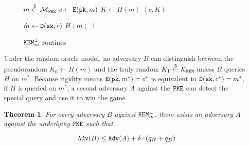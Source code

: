 \documentclass{article}
\newtheorem{theorem}{Theorem}[section]
\begin{document}
\begin{figure}[H]
    \center
    \begin{minipage}{0.49\textwidth}
        \begin{algorithm}[H]
            \caption{$\encap^\bot_m(\pk)$}\label{alg:encap-bot-m}
            \begin{algorithmic}[1]
                \State $m \stackrel{\$}{\leftarrow} \mathcal{M}_\texttt{PKE}$
                \State $c \leftarrow \texttt{E}(\texttt{pk}, m)$
                \State $K \leftarrow H(m)$
                \State \Return $(c, K)$
            \end{algorithmic}
        \end{algorithm}
    \end{minipage}
    \hfill
    \begin{minipage}{0.49\textwidth}
        \begin{algorithm}[H]
            \caption{$\decap^\bot_m(\sk, c)$}\label{alg:decap-bot-m}
            \begin{algorithmic}[1]
                \State $\hat{m} \leftarrow \texttt{D}(\texttt{sk}, c)$
                    \State \Return $H(m)$
                \EndIf
                \State \Return $\bot$
            \end{algorithmic}
        \end{algorithm}
    \end{minipage}
    \caption{$\texttt{KEM}^\bot_m$ routines}\label{fig:u-bot-m-routines}
\end{figure}

Under the random oracle model, no adversary $B$ can distinguish between the pseudorandom $K_0 \leftarrow H(m)$ and the truly random $K_1 \stackrel{\$}{\leftarrow} \mathcal{K}_\texttt{KEM}$ unless $B$ queries $H$ on $m^\ast$.  Because rigidity means $\texttt{E}(\texttt{pk}, m^\ast) = c^\ast$ is equivalent to $\texttt{D}(\texttt{sk}, c^\ast) = m^\ast$, if $H$ is queried on $m^\ast$, a second adversary $A$ against the $\texttt{PKE}$ can detect the special query and use it to win the  game.

\begin{theorem}
    For every  adversary $B$ against $\texttt{KEM}^\bot_m$, there exists an  adversary $A$ against the underlying $\texttt{PKE}$ such that

    \begin{equation*}
        \texttt{Adv}(B) \leq \texttt{Adv}(A) + \delta \cdot (q_H + q_D)
    \end{equation*}
\end{theorem}
\end{document}
